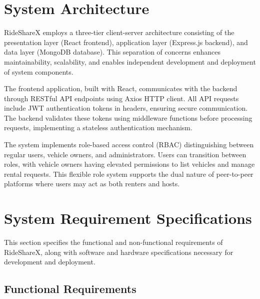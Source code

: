 \documentclass[12pt,a4paper]{report}
\begin{document}
	\section{System Architecture}
	
	RideShareX employs a three-tier client-server architecture consisting of the presentation layer (React frontend), application layer (Express.js backend), and data layer (MongoDB database). This separation of concerns enhances maintainability, scalability, and enables independent development and deployment of system components.
	
	The frontend application, built with React, communicates with the backend through RESTful API endpoints using Axios HTTP client. All API requests include JWT authentication tokens in headers, ensuring secure communication. The backend validates these tokens using middleware functions before processing requests, implementing a stateless authentication mechanism.
	
	The system implements role-based access control (RBAC) distinguishing between regular users, vehicle owners, and administrators. Users can transition between roles, with vehicle owners having elevated permissions to list vehicles and manage rental requests. This flexible role system supports the dual nature of peer-to-peer platforms where users may act as both renters and hosts.
	
	\section{System Requirement Specifications}
	
	This section specifies the functional and non-functional requirements of RideShareX, along with software and hardware specifications necessary for development and deployment.
	
	\subsection{Functional Requirements}
	
\end{document}
